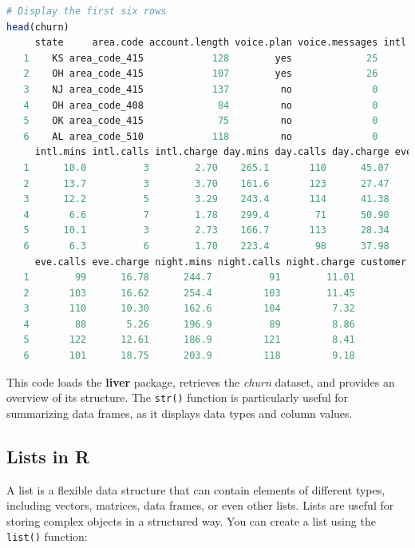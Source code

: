 \documentclass[
  11pt,
]{book}
\newcommand{\passthrough}[1]{#1}
\theoremstyle{definition}
\theoremstyle{definition}
\theoremstyle{definition}
\theoremstyle{definition}
\theoremstyle{remark}
\begin{document}
\begin{lstlisting}[language=R]
# Display the first six rows
head(churn)
     state     area.code account.length voice.plan voice.messages intl.plan
   1    KS area_code_415            128        yes             25        no
   2    OH area_code_415            107        yes             26        no
   3    NJ area_code_415            137         no              0        no
   4    OH area_code_408             84         no              0       yes
   5    OK area_code_415             75         no              0       yes
   6    AL area_code_510            118         no              0       yes
     intl.mins intl.calls intl.charge day.mins day.calls day.charge eve.mins
   1      10.0          3        2.70    265.1       110      45.07    197.4
   2      13.7          3        3.70    161.6       123      27.47    195.5
   3      12.2          5        3.29    243.4       114      41.38    121.2
   4       6.6          7        1.78    299.4        71      50.90     61.9
   5      10.1          3        2.73    166.7       113      28.34    148.3
   6       6.3          6        1.70    223.4        98      37.98    220.6
     eve.calls eve.charge night.mins night.calls night.charge customer.calls churn
   1        99      16.78      244.7          91        11.01              1    no
   2       103      16.62      254.4         103        11.45              1    no
   3       110      10.30      162.6         104         7.32              0    no
   4        88       5.26      196.9          89         8.86              2    no
   5       122      12.61      186.9         121         8.41              3    no
   6       101      18.75      203.9         118         9.18              0    no
\end{lstlisting}

This code loads the \textbf{liver} package, retrieves the \emph{churn} dataset, and provides an overview of its structure. The \passthrough{\lstinline!str()!} function is particularly useful for summarizing data frames, as it displays data types and column values.

\subsection*{Lists in R}\label{lists-in-r}


A list is a flexible data structure that can contain elements of different types, including vectors, matrices, data frames, or even other lists. Lists are useful for storing complex objects in a structured way. You can create a list using the \passthrough{\lstinline!list()!} function:
\end{document}
